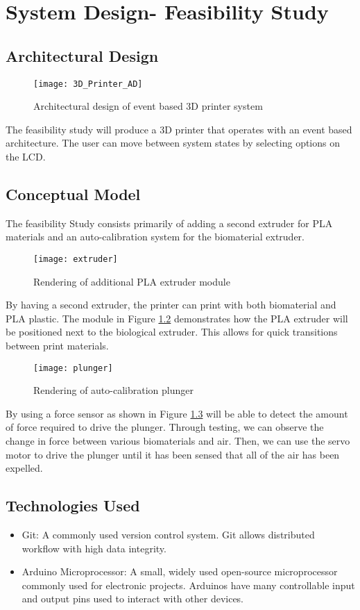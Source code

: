 \chapter{System Design- Feasibility Study}

\section{Architectural Design}
\begin{figure}[H]
\texttt{[image: 3D\_Printer\_AD]}
\caption{\label{figure:3D_Printer_AD} Architectural design of event based 3D printer system}
\end{figure}

The feasibility study will produce a 3D printer that operates with an event based architecture. The user can move between system states by selecting options on the LCD.

\section{Conceptual Model}

The feasibility Study consists primarily of adding a second extruder for PLA materials and an auto-calibration system for the biomaterial extruder.

\begin{figure}[H]
\texttt{[image: extruder]}
\caption{\label{figure:extruder} Rendering of additional PLA extruder module}
\end{figure}

By having a second extruder, the printer can print with both biomaterial and PLA plastic. The module in Figure \ref{figure:extruder} demonstrates how the PLA extruder will be positioned next to the biological extruder. This allows for quick transitions between print materials. 

\begin{figure}[H]
\texttt{[image: plunger]}
\caption{\label{figure:plunger} Rendering of auto-calibration plunger}
\end{figure}

By using a force sensor as shown in Figure \ref{figure:plunger} will be able to detect the amount of force required to drive the plunger. Through testing, we can observe the change in force between various biomaterials and air. Then, we can use the servo motor to drive the plunger until it has been sensed that all of the air has been expelled. 

\section{Technologies Used}
\begin{itemize}
\item Git: A commonly used version control system. Git allows distributed workflow with high data integrity.
\item Arduino Microprocessor: A small, widely used open-source microprocessor commonly used for electronic projects. Arduinos have many controllable input and output pins used to interact with other devices.
\end{itemize}

